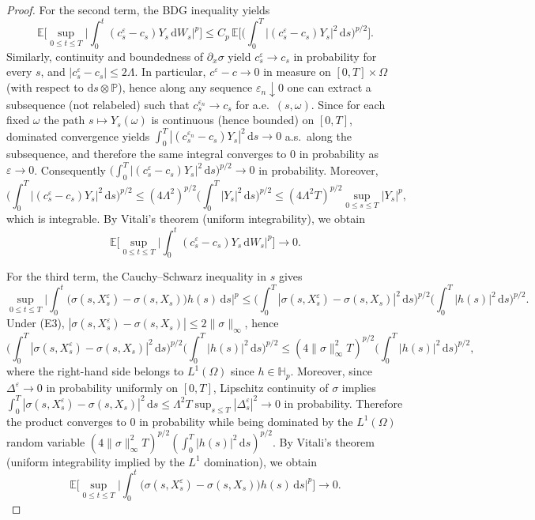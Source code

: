 \documentclass[10pt,a4paper]{amsart}
\newcommand{\E}{\mathbb{E}}
\newcommand{\Hb}{\mathbb{H}}
\newcommand{\Pbb}{\mathbb{P}}
\newcommand{\dd}{\mathrm{d}}
\begin{document}
\begin{proof}
For the second term, the BDG inequality yields
\[
\E\Big[\sup_{0\le t\le T}\Big|\int_0^t (c_s^\varepsilon-c_s)Y_s\,\dd W_s\Big|^p\Big]
\le C_p\,\E\Big[\Big(\int_0^T |(c_s^\varepsilon-c_s)Y_s|^2\,\dd s\Big)^{p/2}\Big].
\]
Similarly, continuity and boundedness of $\partial_x\sigma$ yield $c_s^\varepsilon\to c_s$ in probability for every $s$, and $|c_s^\varepsilon-c_s|\le 2\Lambda$.
In particular, $c^\varepsilon-c\to0$ in measure on $[0,T]\times\Omega$ (with respect to $\dd s\otimes\Pbb$), hence along any sequence $\varepsilon_n\downarrow0$ one can extract a subsequence (not relabeled) such that $c_s^{\varepsilon_n}\to c_s$ for a.e.\ $(s,\omega)$.
Since for each fixed $\omega$ the path $s\mapsto Y_s(\omega)$ is continuous (hence bounded) on $[0,T]$, dominated convergence yields $\int_0^T |(c_s^{\varepsilon_n}-c_s)Y_s|^2\,\dd s\to0$ a.s.\ along the subsequence, and therefore the same integral converges to $0$ in probability as $\varepsilon\to0$.
Consequently $\big(\int_0^T |(c_s^\varepsilon-c_s)Y_s|^2\,\dd s\big)^{p/2}\to0$ in probability.
Moreover,
\[
\Big(\int_0^T |(c_s^\varepsilon-c_s)Y_s|^2\,\dd s\Big)^{p/2}
\le (4\Lambda^2)^{p/2}\Big(\int_0^T |Y_s|^2\,\dd s\Big)^{p/2}
\le (4\Lambda^2T)^{p/2}\sup_{0\le s\le T}|Y_s|^p,
\]
which is integrable. By Vitali's theorem (uniform integrability), we obtain
\[
\E\Big[\sup_{0\le t\le T}\Big|\int_0^t (c_s^\varepsilon-c_s)Y_s\,\dd W_s\Big|^p\Big]\longrightarrow 0.
\]

For the third term, the Cauchy--Schwarz inequality in $s$ gives
\[
\sup_{0\le t\le T}\Big|\int_0^t \big(\sigma(s,X_s^\varepsilon)-\sigma(s,X_s)\big)h(s)\,\dd s\Big|^p
\le \Big(\int_0^T |\sigma(s,X_s^\varepsilon)-\sigma(s,X_s)|^2\,\dd s\Big)^{p/2}\Big(\int_0^T |h(s)|^2\,\dd s\Big)^{p/2}.
\]
Under (E3), $|\sigma(s,X_s^\varepsilon)-\sigma(s,X_s)|\le 2\|\sigma\|_\infty$, hence
\[
\Big(\int_0^T |\sigma(s,X_s^\varepsilon)-\sigma(s,X_s)|^2\,\dd s\Big)^{p/2}\Big(\int_0^T |h(s)|^2\,\dd s\Big)^{p/2}
\le (4\|\sigma\|_\infty^2 T)^{p/2}\Big(\int_0^T |h(s)|^2\,\dd s\Big)^{p/2},
\]
where the right-hand side belongs to $L^1(\Omega)$ since $h\in \Hb_p$.
Moreover, since $\Delta^\varepsilon\to0$ in probability uniformly on $[0,T]$, Lipschitz continuity of $\sigma$
implies $\int_0^T |\sigma(s,X_s^\varepsilon)-\sigma(s,X_s)|^2\,\dd s\le \Lambda^2T\sup_{s\le T}|\Delta_s^\varepsilon|^2\to0$ in probability.
Therefore the product converges to $0$ in probability while being dominated by the $L^1(\Omega)$ random variable $(4\|\sigma\|_\infty^2 T)^{p/2}(\int_0^T |h(s)|^2\,\dd s)^{p/2}$.
By Vitali's theorem (uniform integrability implied by the $L^1$ domination), we obtain
\[
\E\Big[\sup_{0\le t\le T}\Big|\int_0^t \big(\sigma(s,X_s^\varepsilon)-\sigma(s,X_s)\big)h(s)\,\dd s\Big|^p\Big]\longrightarrow 0.
\]


\end{proof}
\end{document}

